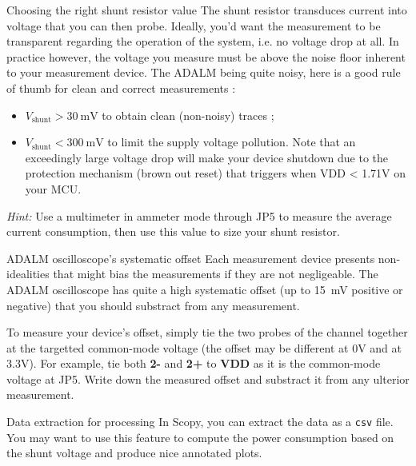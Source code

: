 \begin{bclogo}[couleur = gray!20, arrondi = 0.2, logo=\bcattention]{Choosing the right shunt resistor value}
The shunt resistor transduces current into voltage that you can then probe. Ideally, you'd want the measurement to be transparent regarding the operation of the system, i.e. no voltage drop at all. In practice however, the voltage you measure must be above the noise floor inherent to your measurement device. The ADALM being quite noisy, here is a good rule of thumb for clean and correct measurements :
\begin{itemize}
	\item $V_\text{shunt} > \SI{30}{\milli\volt}$ to obtain clean (non-noisy) traces ;
	\item $V_\text{shunt} < \SI{300}{\milli\volt}$ to limit the supply voltage pollution. Note that an exceedingly large voltage drop will make your device shutdown due to the protection mechanism (brown out reset) that triggers when VDD < 1.71V on your MCU.
\end{itemize}
\textit{Hint:} Use a multimeter in ammeter mode through JP5 to measure the average current consumption, then use this value to size your shunt resistor.
\end{bclogo}

\begin{bclogo}[couleur = gray!20, arrondi = 0.2, logo=\bcattention]{ADALM oscilloscope's systematic offset}
Each measurement device presents non-idealities that might bias the measurements if they are not negligeable. The ADALM oscilloscope has quite a high systematic offset (up to \SI{15}{\milli\volt} positive or negative) that you should substract from any measurement.

To measure your device's offset, simply tie the two probes of the channel together at the targetted common-mode voltage (the offset may be different at 0V and at 3.3V). For example, tie both \textbf{2-} and \textbf{2+} to \textbf{VDD} as it is the common-mode voltage at JP5. Write down the measured offset and substract it from any ulterior measurement.
\end{bclogo}

\begin{bclogo}[couleur = gray!20, arrondi = 0.2, logo=\bcinfo]{Data extraction for processing}
In Scopy, you can extract the data as a \texttt{csv} file. You may want to use this feature to compute the power consumption based on the shunt voltage and produce nice annotated plots.
\end{bclogo}

